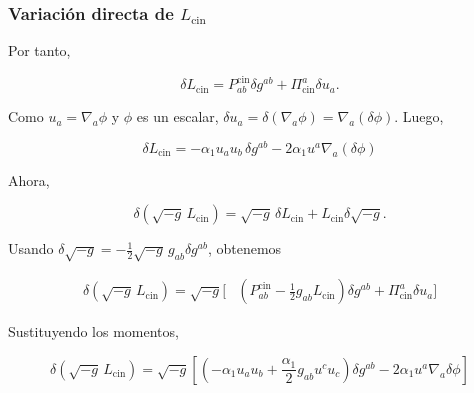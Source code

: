 \documentclass{beamer}
\newcommand{\DenseDisplaySpacing}{%
\setlength{\abovedisplayskip}{1pt}%
\setlength{\belowdisplayskip}{1pt}%
\setlength{\abovedisplayshortskip}{0pt}%
\setlength{\belowdisplayshortskip}{0pt}%
\setlength{\jot}{1pt}%
}
\begin{document}
\begin{frame}[label=nav-frame-094]
\frametitle{Variación directa de \(L_{\mathrm{cin}}\)}
\small
\linespread{.94}\selectfont\DenseDisplaySpacing

Por tanto,

\[
\boxed{
\delta L_{\mathrm{cin}}
=
P^{\mathrm{cin}}_{ab}\delta g^{ab}
+
\Pi^a_{\mathrm{cin}}\delta u_a.
}
\]

Como $u_a=\nabla_a\phi$ y \(\phi\) es un escalar, $\delta u_a = \delta(\nabla_a\phi) = \nabla_a(\delta\phi)$. Luego,

\[
\delta L_{\mathrm{cin}}
=
-\alpha_1u_a u_b\,\delta g^{ab}
-
2\alpha_1u^a\nabla_a(\delta\phi)
\]



Ahora,

\[
\delta(\sqrt{-g}\,L_{\mathrm{cin}})
=
\sqrt{-g}\,\delta L_{\mathrm{cin}}
+
L_{\mathrm{cin}}\delta\sqrt{-g}.
\]

Usando $\delta\sqrt{-g} = -\frac12\sqrt{-g}\, g_{ab}\delta g^{ab}$, obtenemos

\begin{align*}
\delta(\sqrt{-g}\,L_{\mathrm{cin}})
=
\sqrt{-g}\Bigg[
&
\left(
P^{\mathrm{cin}}_{ab}
-\frac12g_{ab}L_{\mathrm{cin}}
\right)\delta g^{ab}
+
\Pi^a_{\mathrm{cin}}\delta u_a
\Bigg]
\end{align*}


Sustituyendo los momentos,

\[
\delta(\sqrt{-g}\,L_{\mathrm{cin}})
=
\sqrt{-g}
\left[
\left(
-\alpha_1u_a u_b
+
\frac{\alpha_1}{2}g_{ab}u^cu_c
\right)\delta g^{ab}
-
2\alpha_1u^a\nabla_a\delta\phi
\right]
\]

\end{frame}
\end{document}
